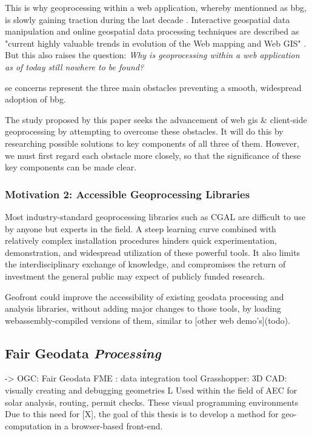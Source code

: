 This is why \ac{geoprocessing} within a web application, whereby mentionned as \ac{bbg}, is slowly gaining traction during the last decade \cite{kulawiak_analysis_2019, panidi_hybrid_2015, hamilton_client-side_2014}. Interactive geospatial data manipulation and online geospatial data processing techniques are described as "current highly valuable trends in evolution of the Web mapping and Web GIS" \cite{panidi_hybrid_2015}. But this also raises the question: \textit{Why is geoprocessing within a web application as of today still nowhere to be found?} 

se concerns represent the three main obstacles preventing a smooth, widespread adoption of \ac{bbg}. 

The study proposed by this paper seeks the advancement of web \ac{gis} \& client-side geoprocessing by attempting to overcome these obstacles. It will do this by researching possible solutions to key components of all three of them. However, we must first regard each obstacle more closely, so that the significance of these key components can be made clear. 

\subsubsection{Motivation 2: Accessible Geoprocessing Libraries}

Most industry-standard geoprocessing libraries such as CGAL are difficult to use by anyone but experts in the field. A steep learning curve combined with relatively complex installation procedures hinders quick experimentation, demonstration, and widespread utilization of these powerful tools. It also limits the interdisciplinary exchange of knowledge, and compromises the return of investment the general public may expect of publicly funded research.

Geofront could improve the accessibility of existing geodata processing and analysis libraries, without adding major changes to those tools, by loading webassembly-compiled versions of them, similar to [other web demo's](todo).








\subsection*{Fair Geodata \emph{Processing}}
-> OGC: Fair Geodata
\m{->} FME : data integration tool
\m{->} Grasshopper: 3D CAD: visually creating and debugging geometries
       L \m{->} Used within the field of AEC for solar analysis, routing, permit checks.
These visual programming environments 
Due to this need for [X], the goal of this thesis is to develop a method for geo-computation in a browser-based front-end. 


